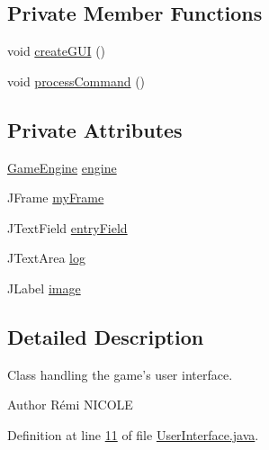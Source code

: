 \subsection*{Private Member Functions}
\begin{DoxyCompactItemize}
\item 
void \hyperlink{classUserInterface_a5aa4ca5e24c9fce93ef91e5a6d0abd60}{create\-G\-U\-I} ()
\item 
void \hyperlink{classUserInterface_a8729aa2e61c87f957663577707f449a5}{process\-Command} ()
\end{DoxyCompactItemize}
\subsection*{Private Attributes}
\begin{DoxyCompactItemize}
\item 
\hyperlink{classGameEngine}{Game\-Engine} \hyperlink{classUserInterface_a661433c9712933f89b2cf30dfb10ffef}{engine}
\item 
J\-Frame \hyperlink{classUserInterface_a1bb844238b260f6d4ae1852b6b1e0b97}{my\-Frame}
\item 
J\-Text\-Field \hyperlink{classUserInterface_a940367d996e9e7ad6e1fa1abfe35128b}{entry\-Field}
\item 
J\-Text\-Area \hyperlink{classUserInterface_a7f6ed10812f99e2cc6ce5f497d8ba2a0}{log}
\item 
J\-Label \hyperlink{classUserInterface_a0d115eb19b54f3e002ec6aa0fcfb1db4}{image}
\end{DoxyCompactItemize}


\subsection{Detailed Description}
Class handling the game's user interface. \begin{DoxyAuthor}{Author}
Rémi N\-I\-C\-O\-L\-E 
\end{DoxyAuthor}


Definition at line \hyperlink{UserInterface_8java_source_l00011}{11} of file \hyperlink{UserInterface_8java_source}{User\-Interface.\-java}.



